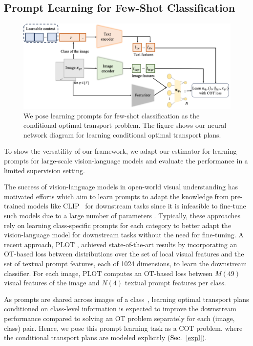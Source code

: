 \subsection{Prompt Learning for Few-Shot Classification}\label{sec:prompt}
\begin{figure}[t]
    \centering
    \includegraphics[width=0.9\columnwidth]{chapter-3/images/prompt.pdf}
    \caption[Illustration of the proposed experimental setup for learning prompts for few-shot classification with the proposed COT formulation.]{We pose learning prompts for few-shot classification as the conditional optimal transport problem. The figure shows our neural network diagram for learning conditional optimal transport plans.}
    \label{prompt-diag}
\end{figure}
To show the versatility of our framework, we adapt our estimator for learning prompts for large-scale vision-language models and evaluate the performance in a limited supervision setting. 

The success of vision-language models in open-world visual understanding has motivated efforts which aim to learn prompts to adapt the knowledge from pre-trained models like CLIP~\citep{clip} for downstream tasks since it is infeasible to fine-tune such models due to a large number of parameters \citep{zhou2022cocoop, zhang2021tip, coop,chen2023plot}. Typically, these approaches rely on learning class-specific prompts for each category to better adapt the vision-language model for downstream tasks without the need for fine-tuning. A recent approach, PLOT \citep{chen2023plot}, achieved state-of-the-art results by incorporating an OT-based loss between distributions over the set of local visual features and the set of textual prompt features, each of 1024 dimensions, to learn the downstream classifier. For each image, PLOT computes an OT-based loss between $M (49)$ visual features of the image and $N (4)$ textual prompt features per class. 


 As prompts are shared across images of a class~\citep{chen2023plot}, learning optimal transport plans conditioned on class-level information is expected to improve the downstream performance compared to solving an OT problem separately for each (image, class) pair. Hence, we pose this prompt learning task as a COT problem, where the conditional transport plans are modeled explicitly ($\S$~\ref{expl}).

